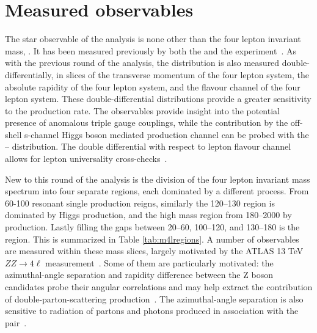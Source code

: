 \section{Measured observables}

The star observable of the analysis is none other than the four lepton invariant mass, \mFourL. It has been measured previously by both the \ATLAS and the \CMS experiment~\cite{Aad:2014tca,Aad:2015rka,Aaboud:2019lxo}. As with the previous round of the analysis, the \mFourL{} distribution is also measured double-differentially, in slices of the transverse momentum of the four lepton system, the absolute rapidity of the four lepton system, and the flavour channel of the four lepton system. These double-differential distributions provide a greater sensitivity to the \ggZZ{} production rate. The \ptFourL{} observables provide insight into the potential presence of anomalous triple gauge couplings, while the contribution by the off-shell s-channel Higgs boson mediated production channel can be probed with the \mFourL{}--\yFourL{} distribution. The double differential with respect to lepton flavour channel allows for lepton universality cross-checks~\cite{Aaboud:2019lxo}.

New to this round of the analysis is the division of the four lepton invariant mass spectrum into four separate regions, each dominated by a different process. From \unit{60}{\GeV}-\unit{100}{\GeV} resonant single \Z production reigns, similarly the \unit{120}{\GeV}--\unit{130}{\GeV} region is dominated by Higgs production, and the high mass region from \unit{180}{\GeV}--\unit{2000}{\GeV} by \onshellZZ{} production. Lastly filling the gaps between  \unit{20}{\GeV}--\unit{60}{\GeV}, \unit{100}{\GeV}--\unit{120}{\GeV}, and \unit{130}{\GeV}--\unit{180}{\GeV} is the \offshellZZ{} region. This is summarized in Table \ref{tab:m4lregions}. A number of observables are measured within these mass slices, largely motivated by the ATLAS 13 TeV $ZZ \rightarrow 4\ell$ measurement~\cite{Aaboud:97.032005}. Some of them are particularly motivated: the azimuthal-angle separation and rapidity difference between the Z boson candidates probe their angular correlations and may help extract the contribution of double-parton-scattering \Z\Z production~\cite{Aaboud:97.032005}. The azimuthal-angle separation is also sensitive to radiation of partons and photons produced in association with the \Z\Z pair~\cite{Aaboud:97.032005}. 

